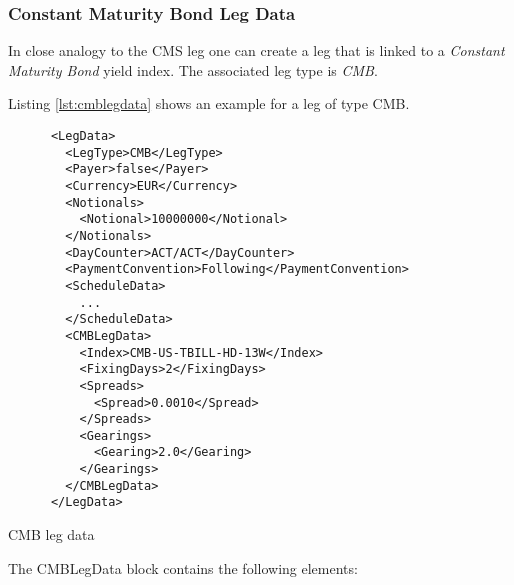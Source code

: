 \subsubsection{Constant Maturity Bond Leg Data}
\label{ss:cmblegdata}

In close analogy to the CMS leg one can create a leg that is linked to a
{\em Constant Maturity Bond} yield index. The associated leg type is {\em CMB}.  

Listing \ref{lst:cmblegdata} shows an example for a leg of type CMB. 

\begin{listing}[H]
\begin{verbatim}
      <LegData>
        <LegType>CMB</LegType>
        <Payer>false</Payer>
        <Currency>EUR</Currency>
        <Notionals>
          <Notional>10000000</Notional>
        </Notionals>
        <DayCounter>ACT/ACT</DayCounter>
        <PaymentConvention>Following</PaymentConvention>
        <ScheduleData>
          ...
        </ScheduleData>
        <CMBLegData>
          <Index>CMB-US-TBILL-HD-13W</Index>
          <FixingDays>2</FixingDays>
          <Spreads>
            <Spread>0.0010</Spread>
          </Spreads>
          <Gearings>
            <Gearing>2.0</Gearing>
          </Gearings>
        </CMBLegData>
      </LegData>
\end{verbatim}
\caption{CMB leg data}
\label{lst:cmblegdata}
\end{listing}

The CMBLegData block contains the following elements:

